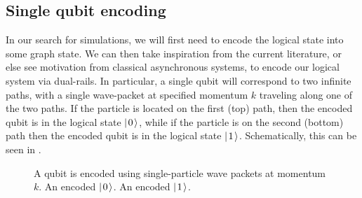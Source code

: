 \documentclass[../thesis-main/thesis-main]{subfiles}
\begin{document}

\subsection{Single qubit encoding}\label{sec:single_qubit_encoding}

In our search for simulations, we will first need to encode the logical state into some graph state.  We can then take inspiration from the current literature, or else see motivation from classical asynchronous systems, to encode our logical system via dual-rails.  In particular, a single qubit will correspond to two infinite paths, with a single wave-packet at specified momentum $k$ traveling along one of the two paths.  If the particle is located on the first (top) path, then the encoded qubit is in the logical state $|\mspace{2mu} 0 \mspace{2mu} \rangle$, while if the particle is on the second (bottom) path then the encoded qubit is in the logical state $|\mspace{2mu} 1 \mspace{2mu} \rangle$.  Schematically, this can be seen in .


\begin{figure}
  \centering
  \qquad
  \caption{A qubit is encoded using single-particle wave packets at momentum $k$.   An encoded $|\mspace{2mu} 0 \mspace{2mu} \rangle$.   An encoded $|\mspace{2mu} 1 \mspace{2mu} \rangle$.}
  \label{fig:wavetrain_encoding}
\end{figure}
\end{document}
